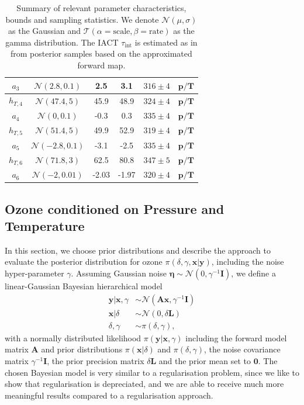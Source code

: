 \begin{table}
\begin{tabular}{ |c||c|c|c|c|c|   }
		$a_{3}$ &  $\mathcal{N}(2.8,0.1)$&2.5 &3.1&$316 \pm 4$&$\bm{p/T}$\\ \hline
		$h_{T,4}$ &  $\mathcal{N}(47.4,5)$&45.9 &48.9&$324 \pm 4$&$\bm{p/T}$\\ \hline
		$a_{4}$ &  $\mathcal{N}(0,0.1)$&-0.3 &0.3&$335 \pm 4$&$\bm{p/T}$\\ \hline
		$h_{T,5}$ &  $\mathcal{N}(51.4,5)$&49.9 &52.9&$319 \pm 4$&$\bm{p/T}$\\ \hline
		$a_{5}$ &  $\mathcal{N}(-2.8,0.1)$&-3.1 &-2.5&$335 \pm 4$&$\bm{p/T}$\\ \hline
		$h_{T,6}$ &  $\mathcal{N}(71.8,3)$&62.5 &80.8&$347 \pm 5$&$\bm{p/T}$\\ \hline
		$a_{6}$ & $\mathcal{N}(-2,0.01)$ &-2.03 &-1.97&$320 \pm 4$&$\bm{p/T}$\\
		\hline
	\end{tabular}
	\caption[Summary of relevant parameter characteristics, bounds and sampling statistics.]{Summary of relevant parameter characteristics, bounds and sampling statistics. We denote $\mathcal{N}(\mu,\sigma)$ as the Gaussian and $\mathcal{T}(\alpha = \text{scale}, \beta = \text{rate})$ as the gamma distribution. The IACT $\tau_{\text{int}}$ is estimated as in \cite{UwerrM} from posterior samples based on the approximated forward map.}
	\label{tab:priors}
\end{table}

\subsection{Ozone conditioned on Pressure and Temperature}
\label{subsec:OzoneSetup}
In this section, we choose prior distributions and describe the approach to evaluate the posterior distribution for ozone $\pi(\delta, \gamma, \bm{x}|\bm{y})$, including the noise hyper-parameter $\gamma$.
Assuming Gaussian noise $\bm{\eta} \sim \mathcal{N}(0, \gamma^{-1} \bm{I})$, we define a linear-Gaussian Bayesian hierarchical model~\cite{fox2016fast}
\begin{subequations}
	\begin{align}
		\bm{y} |  \bm{x}, \gamma &\sim \mathcal{N}(\bm{A} \bm{x}, \gamma^{-1} \bm{I}) \label{eq:likelihood} \\
		\bm{x} |  \delta &\sim \mathcal{N}(0, \delta \bm{L}) \label{eq:xPrior} \\
		\delta, \gamma &\sim \pi(\delta, \gamma) \label{eq:gammaPrior},
	\end{align}
	\label{eq:BayMode}
\end{subequations}
with a normally distributed likelihood $\pi(\bm{y} |  \bm{x}, \gamma)$ including the forward model matrix $\bm{A}$ and prior distributions $\pi(\bm{x} |  \delta)$ and $\pi(\delta, \gamma)$, the noise covariance matrix $\gamma^{-1} \bm{I}$, the prior precision matrix $\delta \bm{L}$ and the prior mean set to $\bm{0}$.
The chosen Bayesian model is very similar to a regularisation problem, since we like to show that regularisation is depreciated, and we are able to receive much more meaningful results compared to a regularisation approach.

